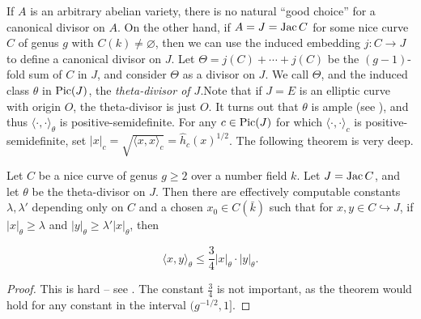 \documentclass{article}
\begin{document}
If $A$ is an arbitrary abelian variety, there is no natural ``good choice'' for 
a canonical divisor on $A$. On the other hand, if $A=J=\operatorname{Jac} C$ for some nice 
curve $C$ of genus $g$ with $C(k)\ne\varnothing$, then we can use the induced 
embedding $j:C\to J$ to define a canonical divisor on $J$. Let 
$\Theta=j(C)+\cdots + j(C)$ be the $(g-1)$-fold sum of $C$ in $J$, and consider 
$\Theta$ as a divisor on $J$. We call $\Theta$, and the induced class $\theta$ 
in $\operatorname{Pic}(J)$, the \emph{theta-divisor of $J$}.Note that if $J=E$ is an elliptic 
curve with origin $O$, the theta-divisor is just $O$.  It turns out that 
$\theta$ is ample (see \cite[8.10.22]{bg06}), and thus 
$\langle\cdot,\cdot\rangle_\theta$ is positive-semidefinite. For any 
$c\in \operatorname{Pic}(J)$ for which $\langle\cdot,\cdot\rangle_c$ is 
positive-semidefinite, set 
$|x|_c=\sqrt{\langle x,x\rangle_c} = \widehat h_c(x)^{1/2}$. The following 
theorem is very deep.

\begin{theorem}
Let $C$ be a nice curve of genus $g\geqslant 2$ over a number field $k$. Let 
$J=\operatorname{Jac} C$, and let $\theta$ be the theta-divisor on $J$. Then there are 
effectively computable constants $\lambda,\lambda'$ depending only on $C$ and 
a chosen $x_0\in C(\bar k)$ such that for $x,y\in C\hookrightarrow J$, if 
$|x|_\theta\geqslant \lambda$ and 
$|y|_\theta\geqslant \lambda'|x|_\theta$, then 

\[
  \langle x,y\rangle_\theta \leqslant \frac 3 4 |x|_\theta\cdot |y|_\theta\text{.}
\]
\end{theorem}
\begin{proof}
This is hard -- see \cite[11.9.1]{bg06}. The constant $\frac 3 4$ is not 
important, as the theorem would hold for any constant in the interval 
$(g^{-1/2},1]$. 
\end{proof}










\end{document}
